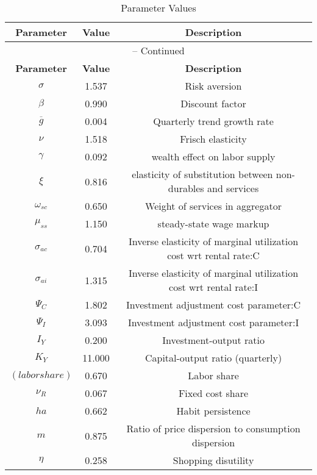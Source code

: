 \begin{center}
\begin{longtable}{ccc}
\caption{Parameter Values}\\%
\toprule%
\multicolumn{1}{c}{\textbf{Parameter}} &
\multicolumn{1}{c}{\textbf{Value}} &
 \multicolumn{1}{c}{\textbf{Description}}\\%
\midrule%
\endfirsthead
\multicolumn{3}{c}{{\tablename} \thetable{} -- Continued}\\%
\midrule%
\multicolumn{1}{c}{\textbf{Parameter}} &
\multicolumn{1}{c}{\textbf{Value}} &
  \multicolumn{1}{c}{\textbf{Description}}\\%
\midrule%
\endhead
${\sigma}$ 	 & 	 1.537 	 & 	 Risk aversion\\
${\beta}$ 	 & 	 0.990 	 & 	 Discount factor\\
${\overline{g}}$ 	 & 	 0.004 	 & 	 Quarterly trend growth rate\\
$\nu$ 	 & 	 1.518 	 & 	 Frisch elasticity\\
$\gamma$ 	 & 	 0.092 	 & 	 wealth effect on labor supply\\
$\xi$ 	 & 	 0.816 	 & 	 elasticity of substitution between non-durables and services\\
$\omega_{sc}$ 	 & 	 0.650 	 & 	 Weight of services in aggregator\\
$\mu_{ss}$ 	 & 	 1.150 	 & 	 steady-state wage markup\\
${\sigma_{ac}}$ 	 & 	 0.704 	 & 	 Inverse elasticity of marginal utilization cost wrt rental rate:C\\
${\sigma_{ai}}$ 	 & 	 1.315 	 & 	 Inverse elasticity of marginal utilization cost wrt rental rate:I\\
${\Psi_C}$ 	 & 	 1.802 	 & 	 Investment adjustment cost parameter:C\\
${\Psi_I}$ 	 & 	 3.093 	 & 	 Investment adjustment cost parameter:I\\
${I_Y}$ 	 & 	 0.200 	 & 	 Investment-output ratio\\
${K_Y}$ 	 & 	 11.000 	 & 	 Capital-output ratio (quarterly)\\
$(labor share)$ 	 & 	 0.670 	 & 	 Labor share\\
${\nu_R}$ 	 & 	 0.067 	 & 	 Fixed cost share\\
${ha}$ 	 & 	 0.662 	 & 	 Habit persistence\\
${m}$ 	 & 	 0.875 	 & 	 Ratio of price dispersion to consumption dispersion\\
${\eta}$ 	 & 	 0.258 	 & 	 Shopping disutility\\

\end{longtable}
\end{center}
